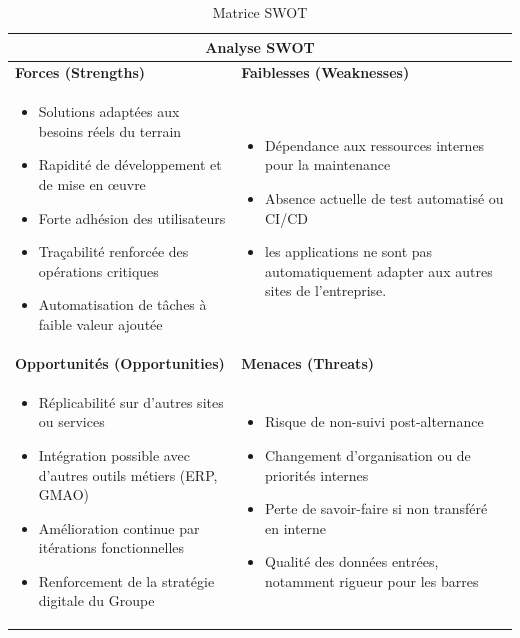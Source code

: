 \documentclass[11pt,a4paper]{article}
\begin{document}
\begin{table}[H]
\centering
\renewcommand{\arraystretch}{1.4}
\begin{tabular}{|p{7cm}|p{7cm}|}
\hline
\multicolumn{2}{|c|}{\textbf{Analyse SWOT}} \\
\hline
\textbf{Forces (Strengths)} &
\textbf{Faiblesses (Weaknesses)} \\
\hline
\begin{itemize}[leftmargin=*]
    \item Solutions adaptées aux besoins réels du terrain
    \item Rapidité de développement et de mise en œuvre
    \item Forte adhésion des utilisateurs
    \item Traçabilité renforcée des opérations critiques
    \item Automatisation de tâches à faible valeur ajoutée
\end{itemize}
&
\begin{itemize}[leftmargin=*]
    \item Dépendance aux ressources internes pour la maintenance
    \item Absence actuelle de test automatisé ou CI/CD
    \item les applications ne sont pas automatiquement adapter aux autres sites de l'entreprise.
\end{itemize}
\\
\hline
\textbf{Opportunités (Opportunities)} &
\textbf{Menaces (Threats)} \\
\hline
\begin{itemize}[leftmargin=*]
    \item Réplicabilité sur d’autres sites ou services
    \item Intégration possible avec d’autres outils métiers (ERP, GMAO)
    \item Amélioration continue par itérations fonctionnelles
    \item Renforcement de la stratégie digitale du Groupe
\end{itemize}
&
\begin{itemize}[leftmargin=*]
    \item Risque de non-suivi post-alternance
    \item Changement d’organisation ou de priorités internes
    \item Perte de savoir-faire si non transféré en interne
    \item Qualité des données entrées, notamment rigueur pour les barres
\end{itemize}
\\
\hline
\end{tabular}
\caption{Matrice SWOT}
\label{tab:swot}
\end{table}
\end{document}
